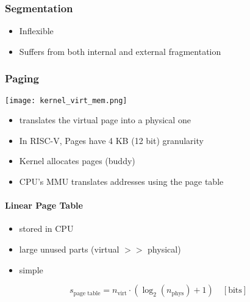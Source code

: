 \subsubsection{Segmentation}

\begin{itemize}
    \item Inflexible
    \item Suffers from both internal and external fragmentation
\end{itemize}

\subsubsection{Paging}
\begin{center}
    \texttt{[image: kernel\_virt\_mem.png]}
\end{center}

\begin{itemize}
    \item translates the virtual page into a physical one
    \item In RISC-V, Pages have 4 KB (12 bit) granularity
    \item Kernel allocates pages (buddy)
    \item CPU's MMU translates addresses using the page table
\end{itemize}

\paragraph{Linear Page Table}
\begin{itemize}
    \item stored in CPU
    \item large unused parts (virtual $>>$ physical)
    \item simple
\end{itemize}

\noindent\begin{equation*}
    s_{\text{page table}} = n_{\text{virt}}\cdot (\log_2(n_{\text{phys}}) + 1)\quad [\text{bits}]
\end{equation*}

